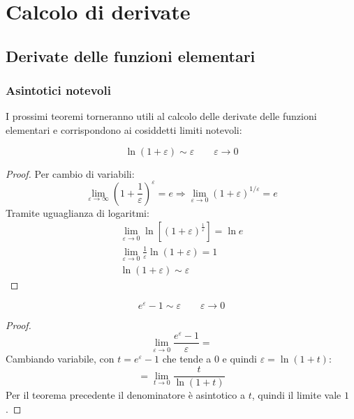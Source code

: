 \section{Calcolo di derivate}


\subsection{Derivate delle funzioni elementari}

\subsubsection{Asintotici notevoli}
I prossimi teoremi torneranno utili al calcolo delle derivate delle funzioni elementari e corrispondono ai cosiddetti limiti notevoli:
\begin{teor}
	\label{deriv:nepero}
	\[
		\ln(1+\varepsilon)\sim\varepsilon \qquad \varepsilon\to 0
	\]
\end{teor}
\begin{proof}
	Per cambio di variabili:
	\[
		\lim_{\varepsilon\to\infty} \left(1+\frac{1}{\varepsilon}\right)^\varepsilon=e\Rightarrow\lim_{\varepsilon\to0} (1+\varepsilon)^{1/\varepsilon}=e
	\]
	Tramite uguaglianza di logaritmi:
	\begin{gather*}
		\lim_{\varepsilon\to0} \ln [(1+\varepsilon)^{\frac{1}{\varepsilon}}]=\ln e\\
		\lim_{\varepsilon\to0} \frac{1}{\varepsilon}\ln(1+\varepsilon)=1\\
		\ln(1+\varepsilon)\sim\varepsilon
	\end{gather*}
\end{proof}

\begin{teor}
	\label{deriv:nepero2}
	\[
		e^\varepsilon-1\sim\varepsilon\qquad\varepsilon\to0
	\]
\end{teor}
\begin{proof}
	\[
		\lim_{\varepsilon\to0} \frac{e^\varepsilon-1}{\varepsilon} =
	\]
	Cambiando variabile, con $t=e^\varepsilon-1$ che tende a $0$ e quindi $\varepsilon=\ln(1+t)$:
	\[
		= \lim_{t\to0} \frac{t}{\ln(1+t)}
	\]
	Per il teorema precedente il denominatore è asintotico a $t$, quindi il limite vale $1$.
\end{proof}

